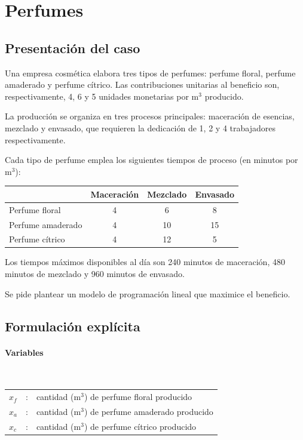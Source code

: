 \section{Perfumes}

\subsection{Presentación del caso}
Una empresa cosmética elabora tres tipos de perfumes: perfume floral, perfume amaderado y perfume cítrico.
Las contribuciones unitarias al beneficio son, respectivamente, 4, 6 y 5 unidades monetarias por m$^3$ producido.

La producción se organiza en tres procesos principales: maceración de esencias, mezclado y envasado, que requieren la dedicación de 1, 2 y 4 trabajadores respectivamente.

Cada tipo de perfume emplea los siguientes tiempos de proceso (en minutos por m$^3$):

\begin{center}
\begin{tabular}{lccc}
\toprule
 & Maceración & Mezclado & Envasado \\
\midrule
Perfume floral & 4 & 6 & 8 \\
Perfume amaderado & 4 & 10 & 15 \\
Perfume cítrico & 4 & 12 & 5 \\
\bottomrule
\end{tabular}
\end{center}

Los tiempos máximos disponibles al día son 240 minutos de maceración, 480 minutos de mezclado y 960 minutos de envasado.

Se pide plantear un modelo de programación lineal que maximice el beneficio.

\subsection{Formulación explícita}

\paragraph{Variables}\mbox{}\\
\begin{tabular}{lcl}
$x_f$ & : & cantidad (m$^3$) de perfume floral producido \\
$x_a$ & : & cantidad (m$^3$) de perfume amaderado producido \\
$x_c$ & : & cantidad (m$^3$) de perfume cítrico producido \\
\end{tabular}

